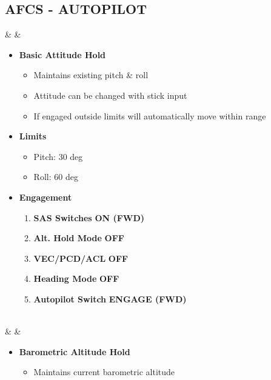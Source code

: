 \documentclass[fontInter]{TechCheck}
\begin{document}
	\subsection{AFCS - AUTOPILOT}
	\begin{listlongtable}
		\textbf{\textbf{\textbullet}} &  &
		\begin{minipage}[t]{\linewidth}
			\vspace{-7pt}
			\begin{itemize}
				\item \textbf{Basic Attitude Hold}
				\begin{itemize}
					\item Maintains existing pitch \& roll
					\item Attitude can be changed with stick input
					\item If engaged outside limits will automatically move within range
				\end{itemize}
				\item \textbf{Limits}
				\begin{itemize}
					\item Pitch: 30 deg
					\item Roll: 60 deg
				\end{itemize}
				\item \textbf{Engagement}
				\begin{enumerate}
					\item \textbf{SAS Switches} \dotfill \textbf{ON (FWD)}
					\item \textbf{Alt. Hold Mode} \dotfill \textbf{OFF}
					\item \textbf{VEC/PCD/ACL} \dotfill \textbf{OFF}
					\item \textbf{Heading Mode} \dotfill \textbf{OFF}
					\item \textbf{Autopilot Switch} \dotfill \textbf{ENGAGE (FWD)}
				\end{enumerate}
			\end{itemize}
		\end{minipage} \\
		\midrule
		\textbf{\textbf{\textbullet}} &  &
		\begin{minipage}[t]{\linewidth}
			\vspace{-7pt}
			\begin{itemize}
				\item \textbf{Barometric Altitude Hold}
				\begin{itemize}
					\item Maintains current barometric altitude

\end{itemize}
\end{itemize}
\end{minipage}
\end{listlongtable}
\end{document}
